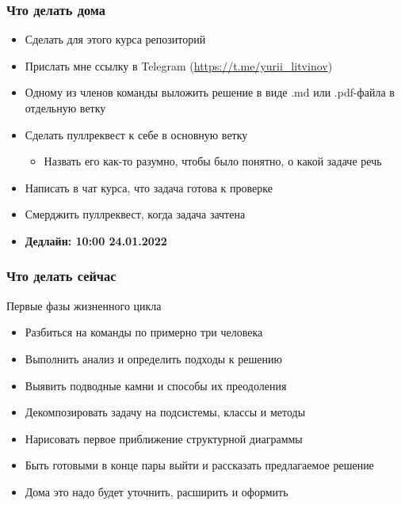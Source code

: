 \documentclass[xetex,mathserif,serif]{beamer}
\begin{document}
    \begin{frame}
        \frametitle{Что делать дома}
        \begin{itemize}
            \item Сделать для этого курса репозиторий
            \item Прислать мне ссылку в Telegram (\url{https://t.me/yurii_litvinov})
            \item Одному из членов команды выложить решение в виде .md или .pdf-файла в отдельную ветку
            \item Сделать пуллреквест к себе в основную ветку
            \begin{itemize}
                \item Назвать его как-то разумно, чтобы было понятно, о какой задаче речь
            \end{itemize}
            \item Написать в чат курса, что задача готова к проверке
            \item Смерджить пуллреквест, когда задача зачтена
            \item \textbf{Дедлайн: 10:00 24.01.2022}
        \end{itemize}
    \end{frame}

    \begin{frame}
        \frametitle{Что делать сейчас}
        Первые фазы жизненного цикла
        \begin{itemize}
            \item Разбиться на команды по примерно три человека
            \item Выполнить анализ и определить подходы к решению
            \item Выявить подводные камни и способы их преодоления
            \item Декомпозировать задачу на подсистемы, классы и методы
            \item Нарисовать первое приближение структурной диаграммы
            \item Быть готовыми в конце пары выйти и рассказать предлагаемое решение
            \item Дома это надо будет уточнить, расширить и оформить
        \end{itemize}
    \end{frame}
\end{document}
